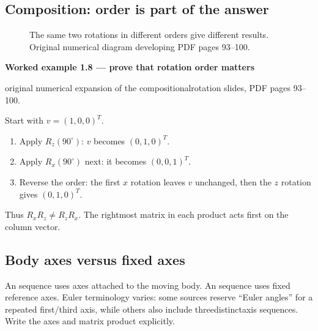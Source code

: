\documentclass[letterpaper,11pt,english,openany,oneside]{jupyterBook}
\begin{document}
\subsection{Composition: order is part of the answer}
\label{\detokenize{lectures/lecture01/rotations:composition-order-is-part-of-the-answer}}
\begin{figure}[H]
\centering
\capstart

\noindent{}
\caption{The same two rotations in different orders give different results. Original numerical diagram developing PDF pages 93–100.}\label{\detokenize{lectures/lecture01/rotations:fig-lec01-order}}\end{figure}
\label{\detokenize{lectures/lecture01/rotations:ex-lec01-order}}
\begin{TextbookBox}
\textbf{Worked example 1.8 — prove that rotation order matters}\par\smallskip

\sphinxAtStartPar
{} original numerical expansion of the compositional\sphinxhyphen{}rotation slides, PDF pages 93–100.

\sphinxAtStartPar
Start with \(v=(1,0,0)^T\).
\begin{enumerate}
%
\item {}
\sphinxAtStartPar
Apply \(R_z(90^\circ)\): \(v\) becomes \((0,1,0)^T\).

\item {}
\sphinxAtStartPar
Apply \(R_x(90^\circ)\) next: it becomes \((0,0,1)^T\).

\item {}
\sphinxAtStartPar
Reverse the order: the first \(x\) rotation leaves \(v\) unchanged, then the \(z\) rotation gives \((0,1,0)^T\).

\end{enumerate}

\sphinxAtStartPar
Thus \(R_xR_z\ne R_zR_x\). The rightmost matrix in each product acts first on the column vector.

\end{TextbookBox}


\subsection{Body axes versus fixed axes}
\label{\detokenize{lectures/lecture01/rotations:body-axes-versus-fixed-axes}}
\sphinxAtStartPar
An  sequence uses axes attached to the moving body. An  sequence uses fixed reference axes. Euler terminology varies: some sources reserve “Euler angles” for a repeated first/third axis, while others also include three\sphinxhyphen{}distinct\sphinxhyphen{}axis sequences. Write the axes and matrix product explicitly.
\end{document}
